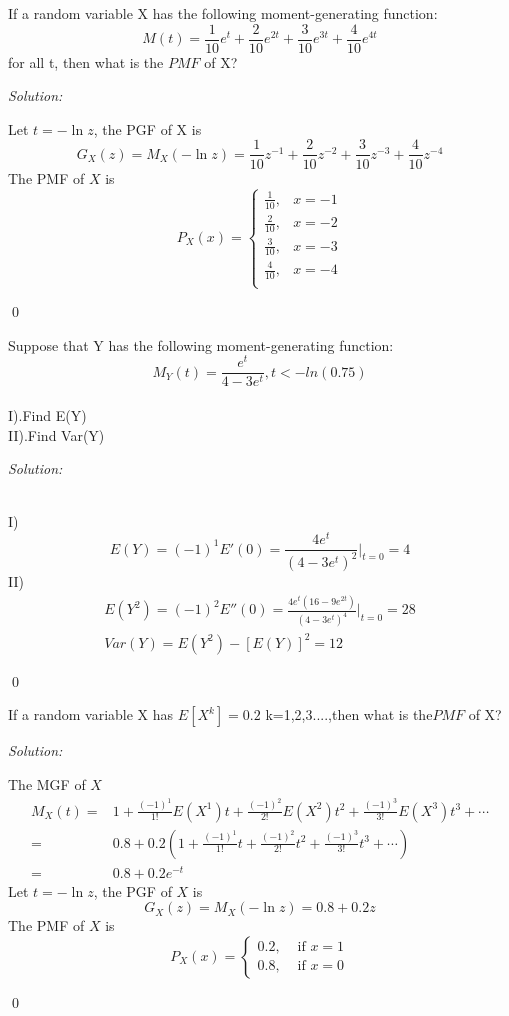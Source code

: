 \documentclass[12pt]{article}
\newenvironment{problem}[2][Problem]{\begin{trivlist}
\item[\hskip \labelsep {\bfseries #1}\hskip \labelsep {\bfseries #2.}]}{\end{trivlist}}
\newenvironment{sol}
    {\emph{Solution:}
    }
    {
    \qed
    }
\begin{document}
\begin{problem}{6}
If a random variable X has the following moment-generating function:
$$M(t) = \frac{1}{10}e^{t} + \frac{2}{10}e^{2t} + \frac{3}{10}e^{3t} + \frac{4}{10}e^{4t}$$
for all t, then what is the $PMF$ of X?
\end{problem}
\begin{sol}
Let $t=-\ln z$, the PGF of X is
\[
G_X(z)=M_X(-\ln z)=\frac{1}{10}z^{-1}+\frac{2}{10}z^{-2}+\frac{3}{10}z^{-3}+\frac{4}{10}z^{-4}
\]
The PMF of $X$ is
\[
P_X(x)=\left\{\begin{array}{ll}
\frac{1}{10},&x=-1\\
\frac{2}{10},&x=-2\\
\frac{3}{10},&x=-3\\
\frac{4}{10},&x=-4\\
\end{array}\right.
\]
\end{sol}



\begin{problem}{7}
 Suppose that Y has the following moment-generating function:
 $$ M_{Y}(t) = \frac{e^t}{4-3e^t}, t < -ln(0.75)$$
 \\
 I).Find  E(Y)\\
 II).Find Var(Y)
\end{problem}
\begin{sol}
\\I)
\[
E(Y)=(-1)^1E'(0)=\frac{4e^t}{(4-3e^t)^2}|_{t=0}=4
\]
II)
\begin{gather*}
E(Y^2)=(-1)^2E''(0)=\frac{4e^t(16-9e^{2t})}{(4-3e^t)^4}|_{t=0}=28\\
Var(Y)=E(Y^2)-[E(Y)]^2=12
\end{gather*}
\end{sol}



\begin{problem}{8}If a random variable X has  $E[X^k] = 0.2$ k=1,2,3....,then what is the$ PMF$ of X?
\end{problem}
\begin{sol}
The MGF of $X$
\begin{align*}
M_X(t)=&1+\frac{(-1)^1}{1!}E(X^1)t+\frac{(-1)^2}{2!}E(X^2)t^2+\frac{(-1)^3}{3!}E(X^3)t^3+\cdots\\
=&0.8+0.2(1+\frac{(-1)^1}{1!}t+\frac{(-1)^2}{2!}t^2+\frac{(-1)^3}{3!}t^3+\cdots)\\
=&0.8+0.2e^{-t}
\end{align*}
Let $t=-\ln z$, the PGF of $X$ is
\[
G_X(z)=M_X(-\ln z)=0.8+0.2z
\]
The PMF of $X$ is
\[
P_X(x)=\left\{\begin{array}{ll}0.2,&\text{ if }x=1\\0.8,&\text{ if }x=0\end{array}\right.
\]
\end{sol}

\end{document}
